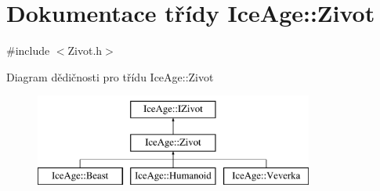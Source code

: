 \hypertarget{classIceAge_1_1Zivot}{}\section{Dokumentace třídy Ice\+Age\+:\+:Zivot}
\label{classIceAge_1_1Zivot}


{\ttfamily \#include $<$Zivot.\+h$>$}

Diagram dědičnosti pro třídu Ice\+Age\+:\+:Zivot\begin{figure}[H]
\begin{center}
\leavevmode
\includegraphics[height=3.000000cm]{d5/de8/classIceAge_1_1Zivot}
\end{center}
\end{figure}
